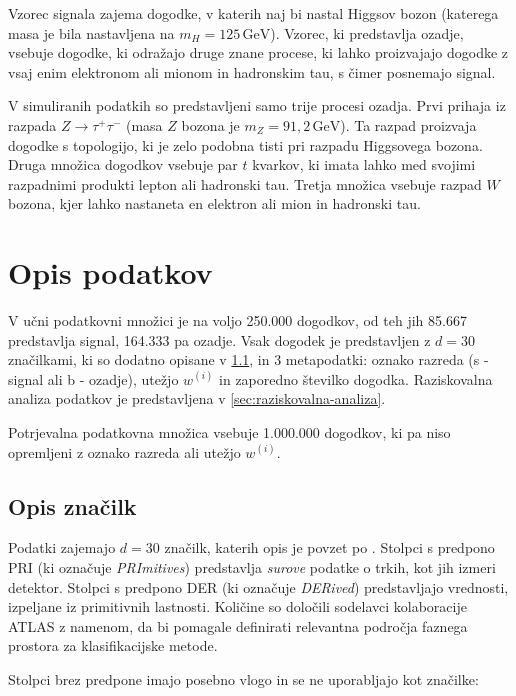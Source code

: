 \documentclass[11pt,a4paper,openany]{book}
\begin{document}
Vzorec signala zajema dogodke, v katerih naj bi nastal Higgsov bozon (katerega masa je bila nastavljena na $m_H = 125\,\text{GeV}$). Vzorec, ki predstavlja ozadje, vsebuje dogodke, ki odražajo druge znane procese, ki lahko proizvajajo dogodke z vsaj enim elektronom ali mionom in hadronskim tau, s čimer posnemajo signal.

V simuliranih podatkih so predstavljeni samo trije procesi ozadja. Prvi prihaja iz razpada $Z \rightarrow \tau^+\tau^-$ (masa $Z$ bozona je $m_Z = 91,2\,\text{GeV}$). Ta razpad proizvaja dogodke s topologijo, ki je zelo podobna tisti pri razpadu Higgsovega bozona. Druga množica dogodkov vsebuje par $t$ kvarkov, ki imata lahko med svojimi razpadnimi produkti lepton ali hadronski tau. Tretja množica vsebuje razpad $W$ bozona, kjer lahko nastaneta en elektron ali mion in hadronski tau. 

\section{Opis podatkov}
\label{ch:opis_podatkov}

V učni podatkovni množici je na voljo 250.000 dogodkov, od teh jih 85.667 predstavlja signal, 164.333 pa ozadje. Vsak dogodek je predstavljen z $d = 30$ značilkami, ki so dodatno opisane v \ref{sec:opis-znacilk}, in 3 metapodatki: oznako razreda (s - signal ali b - ozadje), utežjo $w^{(i)}$ in zaporedno številko dogodka. Raziskovalna analiza podatkov je predstavljena v \ref{sec:raziskovalna-analiza}.

Potrjevalna podatkovna množica vsebuje 1.000.000 dogodkov, ki pa niso opremljeni z oznako razreda ali utežjo $w^{(i)}$. 

\subsection{Opis značilk}
\label{sec:opis-znacilk}
Podatki zajemajo $d = 30$ značilk, katerih opis je povzet po \cite{Adam-Bourdarios14}. Stolpci s predpono PRI (ki označuje \textit{PRImitives}) predstavlja \textit{surove} podatke o trkih, kot jih izmeri detektor. Stolpci s predpono DER (ki označuje \textit{DERived}) predstavljajo vrednosti, izpeljane iz primitivnih lastnosti. Količine so določili sodelavci kolaboracije ATLAS z namenom, da bi pomagale definirati relevantna področja faznega prostora za klasifikacijske metode.

Stolpci brez predpone imajo posebno vlogo in se ne uporabljajo kot značilke:
\end{document}
